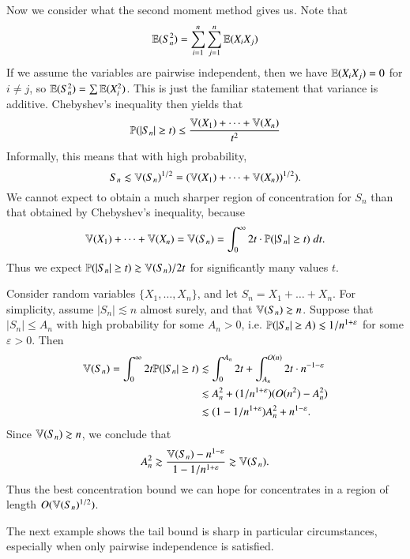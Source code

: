 Now we consider what the second moment method gives us. Note that
%
\[ \operatorname{\mathbb{E}}(S_n^2) = \sum_{i = 1}^n \sum_{j = 1}^n \operatorname{\mathbb{E}}(X_i X_j) \]
%
If we assume the variables are pairwise independent, then we have $\operatorname{\mathbb{E}}(X_i X_j) = 0$ for $i \neq j$, so $\operatorname{\mathbb{E}}(S_n^2) = \sum \operatorname{\mathbb{E}}(X_i^2)$. This is just the familiar statement that variance is additive. Chebyshev's inequality then yields that
%
\[ \mathbb{P}(|S_n| \geq t) \leq \frac{\operatorname{\mathbb{V}}(X_1) + \dots + \operatorname{\mathbb{V}}(X_n)}{t^2} \]
%
Informally, this means that with high probability,
%
\[ S_n \lesssim \operatorname{\mathbb{V}}(S_n)^{1/2} = (\operatorname{\mathbb{V}}(X_1) + \dots + \operatorname{\mathbb{V}}(X_n))^{1/2}). \]
%
We cannot expect to obtain a much sharper region of concentration for $S_n$ than that obtained by Chebyshev's inequality, because
%
\[ \operatorname{\mathbb{V}}(X_1) + \dots + \operatorname{\mathbb{V}}(X_n) = \operatorname{\mathbb{V}}(S_n) = \int_0^\infty 2t \cdot \mathbb{P}(|S_n| \geq t)\; dt. \]
%
Thus we expect $\mathbb{P}(|S_n| \geq t) \gtrsim \operatorname{\mathbb{V}}(S_n) / 2t$ for significantly many values $t$.

\begin{example}
    Consider random variables $\{ X_1, \dots, X_n \}$, and let $S_n = X_1 + \dots + X_n$. For simplicity, assume $|S_n| \lesssim n$ almost surely, and that $\operatorname{\mathbb{V}}(S_n) \gtrsim n$. Suppose that $|S_n| \leq A_n$ with high probability for some $A_n > 0$, i.e. $\operatorname{\mathbb{P}}(|S_n| \geq A) \lesssim 1/n^{1 + \varepsilon}$ for some $\varepsilon > 0$. Then
    \begin{align*}
        \operatorname{\mathbb{V}}(S_n) = \int_0^\infty 2t \mathbb{P}(|S_n| \geq t) &\lesssim \int_0^{A_n} 2t + \int_{A_n}^{O(n)} 2t \cdot n^{-1-\varepsilon} \\
        &\lesssim A_n^2 + (1/n^{1 + \varepsilon}) (O(n^2) - A_n^2)\\
        &\lesssim (1 - 1/n^{1 + \varepsilon}) A_n^2 + n^{1-\varepsilon}.
    \end{align*}
    Since $\operatorname{\mathbb{V}}(S_n) \gtrsim n$, we conclude that
    \[ A_n^2 \gtrsim \frac{\operatorname{\mathbb{V}}(S_n) - n^{1 - \varepsilon}}{1 - 1/n^{1 + \varepsilon}} \gtrsim \operatorname{\mathbb{V}}(S_n). \]
    Thus the best concentration bound we can hope for concentrates in a region of length $O(\operatorname{\mathbb{V}}(S_n)^{1/2})$.
\end{example}

The next example shows the tail bound is sharp in particular circumstances, especially when only pairwise independence is satisfied.

